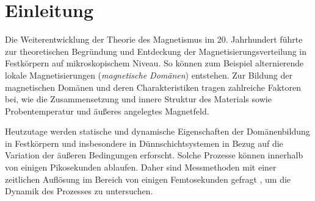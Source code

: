 \chapter{Einleitung}
\label{text:einleitung}


Die Weiterentwicklung der Theorie des Magnetismus im 20. Jahrhundert führte zur theoretischen Begründung und Entdeckung der Magnetisierungsverteilung in Festkörpern auf mikroskopischem Niveau. So können zum Beispiel alternierende lokale Magnetisierungen (\emph{magnetische Domänen}) entstehen. Zur Bildung der magnetischen Domänen und deren Charakteristiken tragen zahlreiche Faktoren bei, wie die Zusammensetzung und innere Struktur des Materials sowie Probentemperatur und äußeres angelegtes Magnetfeld.

\noindent
Heutzutage werden statische und dynamische Eigenschaften der Domänenbildung in Festkörpern und insbesondere in Dünnschichtsystemen in Bezug auf die Variation der äußeren Bedingungen erforscht. Solche Prozesse können innerhalb von einigen Pikosekunden ablaufen. Daher sind Messmethoden mit einer zeitlichen Auflösung im Bereich von einigen Femtosekunden gefragt \cite{pfau_ultrafast_2012}, um die Dynamik des Prozesses zu untersuchen.

